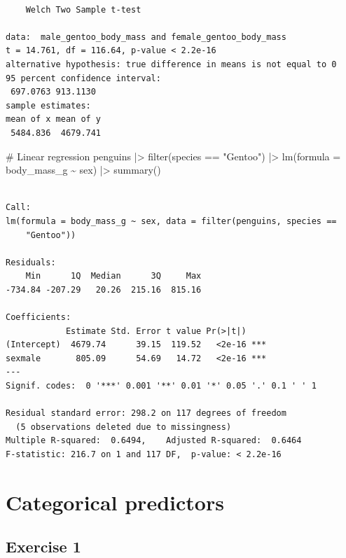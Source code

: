 \documentclass[
  letterpaper,
  DIV=11,
  numbers=noendperiod]{scrreprt}
\newenvironment{Shaded}{\begin{snugshade}}{\end{snugshade}}
\newcommand{\AttributeTok}[1]{\textcolor[rgb]{0.40,0.45,0.13}{#1}}
\newcommand{\CommentTok}[1]{\textcolor[rgb]{0.37,0.37,0.37}{#1}}
\newcommand{\FunctionTok}[1]{\textcolor[rgb]{0.28,0.35,0.67}{#1}}
\newcommand{\NormalTok}[1]{\textcolor[rgb]{0.00,0.23,0.31}{#1}}
\newcommand{\SpecialCharTok}[1]{\textcolor[rgb]{0.37,0.37,0.37}{#1}}
\newcommand{\StringTok}[1]{\textcolor[rgb]{0.13,0.47,0.30}{#1}}
\begin{document}
\begin{verbatim}

    Welch Two Sample t-test

data:  male_gentoo_body_mass and female_gentoo_body_mass
t = 14.761, df = 116.64, p-value < 2.2e-16
alternative hypothesis: true difference in means is not equal to 0
95 percent confidence interval:
 697.0763 913.1130
sample estimates:
mean of x mean of y 
 5484.836  4679.741 
\end{verbatim}

\begin{Shaded}
\begin{Highlighting}[]
\CommentTok{\# Linear regression}
\NormalTok{penguins }\SpecialCharTok{|\textgreater{}} 
  \FunctionTok{filter}\NormalTok{(species }\SpecialCharTok{==} \StringTok{"Gentoo"}\NormalTok{) }\SpecialCharTok{|\textgreater{}}
  \FunctionTok{lm}\NormalTok{(}\AttributeTok{formula =}\NormalTok{ body\_mass\_g }\SpecialCharTok{\textasciitilde{}}\NormalTok{ sex) }\SpecialCharTok{|\textgreater{}}
  \FunctionTok{summary}\NormalTok{()}
\end{Highlighting}
\end{Shaded}

\begin{verbatim}

Call:
lm(formula = body_mass_g ~ sex, data = filter(penguins, species == 
    "Gentoo"))

Residuals:
    Min      1Q  Median      3Q     Max 
-734.84 -207.29   20.26  215.16  815.16 

Coefficients:
            Estimate Std. Error t value Pr(>|t|)    
(Intercept)  4679.74      39.15  119.52   <2e-16 ***
sexmale       805.09      54.69   14.72   <2e-16 ***
---
Signif. codes:  0 '***' 0.001 '**' 0.01 '*' 0.05 '.' 0.1 ' ' 1

Residual standard error: 298.2 on 117 degrees of freedom
  (5 observations deleted due to missingness)
Multiple R-squared:  0.6494,    Adjusted R-squared:  0.6464 
F-statistic: 216.7 on 1 and 117 DF,  p-value: < 2.2e-16
\end{verbatim}

\section{Categorical predictors}\label{categorical-predictors-1}

\subsection{Exercise 1}\label{exercise-1-24}
\end{document}
